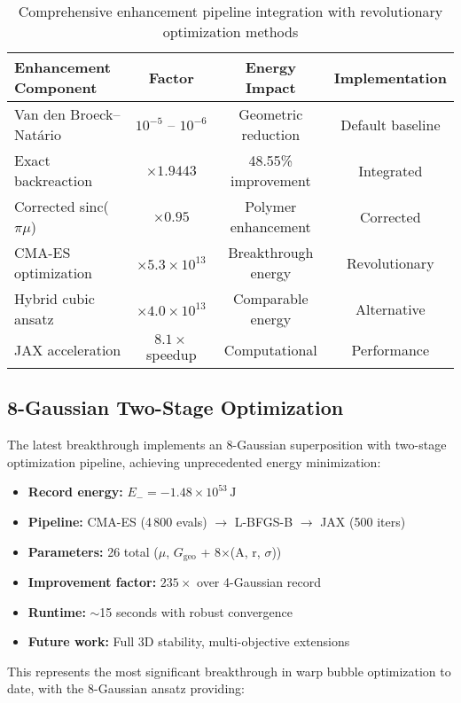 \documentclass[11pt]{article}
\begin{document}
\begin{table}[h]
\centering
\begin{tabular}{lccc}
\toprule
Enhancement Component & Factor & Energy Impact & Implementation \\
\midrule
Van den Broeck–Natário & $10^{-5}$ – $10^{-6}$ & Geometric reduction & Default baseline \\
Exact backreaction & $\times 1.9443$ & 48.55\% improvement & Integrated \\
Corrected sinc($\pi\mu$) & $\times 0.95$ & Polymer enhancement & Corrected \\
CMA-ES optimization & $\times 5.3 \times 10^{13}$ & Breakthrough energy & Revolutionary \\
Hybrid cubic ansatz & $\times 4.0 \times 10^{13}$ & Comparable energy & Alternative \\
JAX acceleration & $8.1 \times$ speedup & Computational & Performance \\
\bottomrule
\end{tabular}
\caption{Comprehensive enhancement pipeline integration with revolutionary optimization methods}
\end{table}

\subsection{8-Gaussian Two-Stage Optimization}

The latest breakthrough implements an 8-Gaussian superposition with two-stage optimization pipeline, achieving unprecedented energy minimization:

\begin{itemize}
  \item \textbf{Record energy:} $E_- = -1.48\times10^{53}\,\mathrm{J}$
  \item \textbf{Pipeline:} CMA-ES (4\,800 evals) $\rightarrow$ L-BFGS-B $\rightarrow$ JAX (500 iters)
  \item \textbf{Parameters:} 26 total ($\mu$, $G_{\text{geo}}$ + 8$\times$(A, r, $\sigma$))
  \item \textbf{Improvement factor:} $235\times$ over 4-Gaussian record
  \item \textbf{Runtime:} $\sim$15 seconds with robust convergence
  \item \textbf{Future work:} Full 3D stability, multi-objective extensions
\end{itemize}

This represents the most significant breakthrough in warp bubble optimization to date, with the 8-Gaussian ansatz providing:
\end{document}
